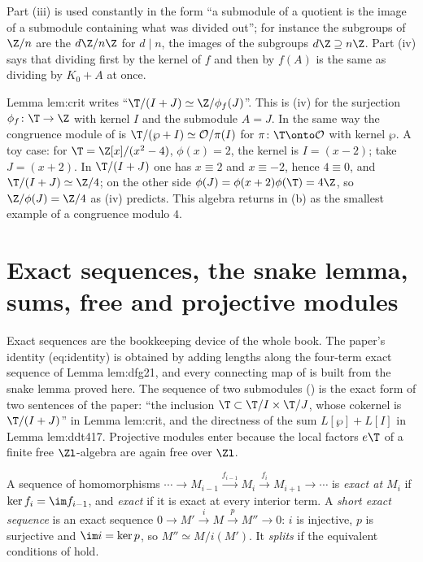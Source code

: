 Part (iii) is used constantly in the form ``a submodule of a quotient is the image of a submodule containing what was
divided out''; for instance the subgroups of $\Z/n$ are the $d\Z/n\Z$ for $d\mid n$, the images of the subgroups $d\Z\supseteq n\Z$.
Part (iv) says that dividing first by the kernel of $f$ and then by $f(A)$ is the same as dividing by $K_0+A$ at once.

\begin{paperlink}\label{pl:modules:iso}
Lemma lem:crit writes ``$\T/(I+J)\simeq\Z/\phi_f(J)$''. This is (iv) for the surjection
$\phi_f\colon\T\to\Z$ with kernel $I$ and the submodule $A=J$. In the same way the congruence module of
 is $\T/(\wp+I)\simeq\mathcal O/\pi(I)$ for $\pi\colon\T\onto\mathcal O$ with kernel $\wp$.
A toy case: for $\T=\Z[x]/(x^2-4)$, $\phi(x)=2$, the kernel is $I=(x-2)$; take $J=(x+2)$. In $\T/(I+J)$ one has $x\equiv2$ and
$x\equiv-2$, hence $4\equiv0$, and $\T/(I+J)\simeq\Z/4$; on the other side $\phi(J)=\phi(x+2)\phi(\T)=4\Z$, so $\Z/\phi(J)=\Z/4$ as
(iv) predicts. This algebra returns in (b) as the smallest example of a congruence modulo $4$.
\end{paperlink}

\section[Exact sequences; free and projective modules]{Exact sequences, the snake lemma, sums, free and projective modules}\label{sec:modules:exact}

Exact sequences are the bookkeeping device of the whole book. The paper's identity (eq:identity) is obtained by
adding lengths along the four-term exact sequence of Lemma lem:dfg21, and every connecting map of  is
built from the snake lemma proved here. The sequence of two submodules () is the exact
form of two sentences of the paper: ``the inclusion $\T\subset\T/I\times\T/J$, whose cokernel is $\T/(I+J)$'' in Lemma
lem:crit, and the directness of the sum $L[\wp]+L[I]$ in Lemma lem:ddt417. Projective modules enter because the local factors
$e\T$ of a finite free $\Zl$-algebra are again free over $\Zl$.

\begin{definition}\label{def:modules:exact}
A sequence of homomorphisms $\cdots\to M_{i-1}\xrightarrow{f_{i-1}}M_i\xrightarrow{f_i}M_{i+1}\to\cdots$ is \emph{exact at $M_i$} if
$\ker f_i=\im f_{i-1}$, and \emph{exact} if it is exact at every interior term. A \emph{short exact sequence} is an exact
sequence $0\to M'\xrightarrow{i}M\xrightarrow{p}M''\to0$: $i$ is injective, $p$ is surjective and $\im i=\ker p$, so
$M''\simeq M/i(M')$. It \emph{splits} if the equivalent conditions of  hold.
\end{definition}


